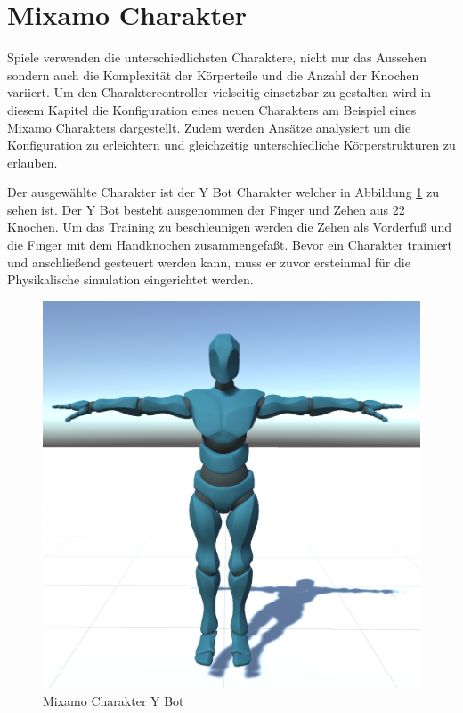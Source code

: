 \section{Mixamo Charakter}
Spiele verwenden die unterschiedlichsten Charaktere, nicht nur das Aussehen sondern auch die Komplexität der Körperteile und die Anzahl der Knochen variiert. Um den Charaktercontroller vielseitig einsetzbar zu gestalten wird in diesem Kapitel die Konfiguration eines neuen Charakters am Beispiel eines Mixamo Charakters dargestellt. Zudem werden Ansätze analysiert um die Konfiguration zu erleichtern und gleichzeitig unterschiedliche Körperstrukturen zu erlauben.

Der ausgewählte Charakter ist der Y Bot Charakter welcher in Abbildung \ref{fig:y_bot} zu sehen ist. Der Y Bot besteht ausgenommen der Finger und Zehen aus 22 Knochen. Um das Training zu beschleunigen werden die Zehen als Vorderfuß und die Finger mit dem Handknochen zusammengefaßt. Bevor ein Charakter trainiert und anschließend gesteuert werden kann, muss er zuvor ersteinmal für die Physikalische simulation eingerichtet werden.

\begin{figure}[H]
  \centering  
  \includegraphics[scale=0.5]{img/y_bot.png}
  \caption{Mixamo Charakter Y Bot}
  \label{fig:y_bot}
\end{figure}

